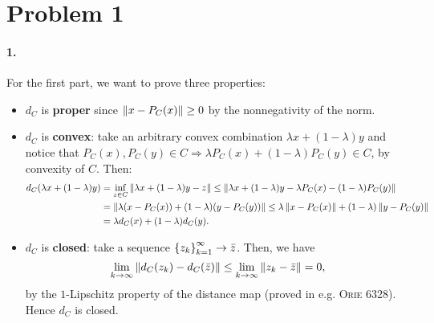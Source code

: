 \documentclass[10pt]{article}
\begin{document}
\allowdisplaybreaks
\everymath{\displaystyle}
\newenvironment{longlisting}{\captionsetup{type=listing}}{}


\section*{Problem 1}
\paragraph{1.}
For the first part, we want to prove three properties:
\begin{itemize}
\item $d_{C}$ is \textbf{proper} since $\left \| x - P_C(x) \right \| \geq 0$ by the
nonnegativity of the norm.
\item $d_{C}$ is \textbf{convex}: take an arbitrary convex combination $
\lambda x + (1 - \lambda) y$ and notice that $P_C(x), P_C(y) \in C \Rightarrow
\lambda P_C(x) + (1 - \lambda) P_C(y) \in C$, by convexity of $C$. Then:
\begin{align*}
    d_C(\lambda x + (1 - \lambda)y) &= \inf_{z \in C}
    \left \| \lambda x + (1 - \lambda) y - z \right \| \leq
    \left \| \lambda x + (1 - \lambda) y - \lambda P_C(x) - (1 - \lambda) P_C(y) \right \|
    \\
    &= \left \| \lambda(x  - P_C(x)) + (1 - \lambda)(y - P_C(y)) \right \| \leq
       \lambda \left \| x - P_C(x) \right \| + (1 - \lambda) \left \| y - P_C(y) \right \| \\
    &=   \lambda d_C(x) + (1 - \lambda) d_C(y).
\end{align*}
\item $d_C$ is \textbf{closed}: take a sequence
$\left\{ z_k \right\}_{k=1}^{\infty} \to \bar{z}$. Then, we have
\[
    \lim_{k \to \infty} \left \| d_C(z_k) - d_C(\bar{z}) \right \| \leq
    \lim_{k \to \infty} \left \| z_k - \bar{z} \right \| = 0,
\]
by the $1$-Lipschitz property of the distance map (proved in e.g. \textsc{Orie
6328}). Hence $d_C$ is closed.
\end{itemize}
\end{document}
